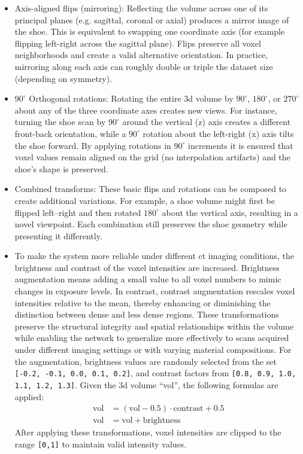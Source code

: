 \begin{itemize}
	\item Axis-aligned flips (mirroring): Reflecting the volume across one of its principal planes (e.g. sagittal, coronal or axial) produces a mirror image of the shoe. This is equivalent to swapping one coordinate axis (for example flipping left-right across the sagittal plane). Flips preserve all voxel neighborhoods and create a valid alternative orientation. In practice, mirroring along each axis can roughly double or triple the dataset size (depending on symmetry).
	
	\item $90^\circ$ Orthogonal rotations: Rotating the entire \gls{3d} volume by $90^\circ$, $180^\circ$, or $270^\circ$ about any of the three coordinate axes creates new views. For instance, turning the shoe scan by $90^\circ$ around the vertical (z) axis creates a different front-back orientation, while a $90^\circ$ rotation about the left-right (x) axis tilts the shoe forward. By applying rotations in $90^\circ$ increments it is ensured that voxel values remain aligned on the grid (no interpolation artifacts) and the shoe's shape is preserved.
	
	\item Combined transforms: These basic flips and rotations can be composed to create additional variations. For example, a shoe volume might first be flipped left–right and then rotated $180^\circ$ about the vertical axis, resulting in a novel viewpoint. Each combination still preserves the shoe geometry while presenting it differently.
	
	\item To make the system more reliable under different \gls{ct} imaging conditions, the brightness and contrast of the voxel intensities are increased. Brightness augmentation means adding a small value to all voxel numbers to mimic changes in exposure levels. In contrast, contrast augmentation rescales voxel intensities relative to the mean, thereby enhancing or diminishing the distinction between dense and less dense regions. These transformations preserve the structural integrity and spatial relationships within the volume while enabling the network to generalize more effectively to scans acquired under different imaging settings or with varying material compositions. For the augmentation, brightness values are randomly selected from the set {\tt [-0.2, -0.1, 0.0, 0.1, 0.2]}, and contrast factors from {\tt [0.8, 0.9, 1.0, 1.1, 1.2, 1.3]}. Given the \gls{3d} volume \enquote{vol}, the following formulas are applied:
	\begin{align}
		\text{vol} &= (\text{vol} - 0.5) \cdot \text{contrast} + 0.5 \\
		\text{vol} &= \text{vol} + \text{brightness}
	\end{align}
	After applying these transformations, voxel intensities are clipped to the range {\tt [0,1]} to maintain valid intensity values.
\end{itemize}

